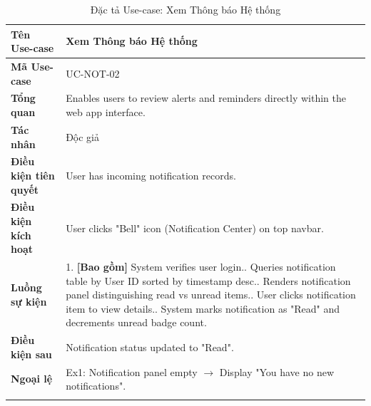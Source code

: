 \newpage
\begin{longtable}{|p{3.5cm}|p{11.5cm}|}
    \hline
    \textbf{Tên Use-case} & \textbf{Xem Thông báo Hệ thống} \\
    \hline
    \textbf{Mã Use-case} & UC-NOT-02 \\
    \hline
    \textbf{Tổng quan} & Enables users to review alerts and reminders directly within the web app interface. \\
    \hline
    \textbf{Tác nhân} & Độc giả \\
    \hline
    \textbf{Điều kiện tiên quyết} & User has incoming notification records. \\
    \hline
    \textbf{Điều kiện kích hoạt} & User clicks "Bell" icon (Notification Center) on top navbar. \\
    \hline
    \textbf{Luồng sự kiện} & 
    1. \textbf{[Bao gồm]} System verifies user login.\newline
    2. Queries notification table by User ID sorted by timestamp desc.\newline
    3. Renders notification panel distinguishing read vs unread items.\newline
    4. User clicks notification item to view details.\newline
    5. System marks notification as "Read" and decrements unread badge count. \\
    \hline
    \textbf{Điều kiện sau} & Notification status updated to "Read". \\
    \hline
    \textbf{Ngoại lệ} & 
    Ex1: Notification panel empty $\rightarrow$ Display "You have no new notifications". \\
    \hline
    \caption{Đặc tả Use-case: Xem Thông báo Hệ thống}
\end{longtable}

